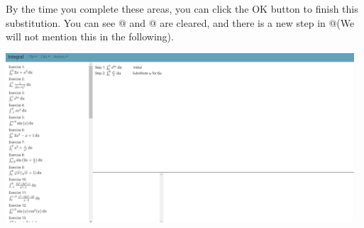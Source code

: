 \documentclass[titlepage]{article}
\makeatletter
\newcommand*{\rom}[1]{\expandafter\@slowromancap\romannumeral #1@}
\makeatother
\begin{document}
By the time you complete these areas, you can click the \colorbox{mygray}{OK} button to finish this substitution. You can see \rom{4} and \rom{5} are cleared, and there is a new step in \rom{3}(We will not mention this in the following).\\
\includegraphics[width=13cm, height=7cm]{11.png}
\end{document}
